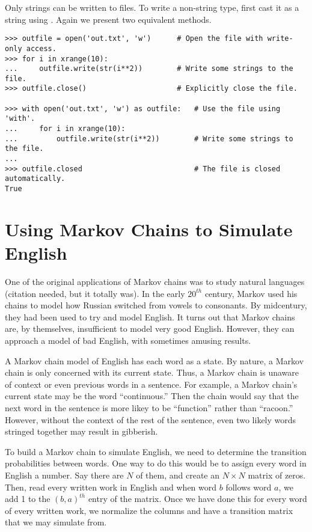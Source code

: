 Only strings can be written to files.
To write a non-string type, first cast it as a string using .
Again we present two equivalent methods.
\begin{lstlisting}
>>> outfile = open('out.txt', 'w') 		# Open the file with write-only access.
>>> for i in xrange(10):
...		outfile.write(str(i**2))		# Write some strings to the file.
>>> outfile.close()						# Explicitly close the file.

>>> with open('out.txt', 'w') as outfile: 	# Use the file using 'with'.
... 	for i in xrange(10): 				
... 		outfile.write(str(i**2)) 		# Write some strings to the file.
...
>>> outfile.closed 							# The file is closed automatically.
True
\end{lstlisting}

\section*{Using Markov Chains to Simulate English}

One of the original applications of Markov chains was to study natural languages (citation needed, but it totally was).
In the early $20^{th}$ century, Markov used his chains to model how Russian switched from vowels to consonants.
By midcentury, they had been used to try and model English.
It turns out that Markov chains are, by themselves, insufficient to model very good English.
However, they can approach a model of bad English, with sometimes amusing results.

A Markov chain model of English has each word as a state.
By nature, a Markov chain is only concerned with its current state.
Thus, a Markov chain is unaware of context or even previous words in a sentence.
For example, a Markov chain's current state may be the word ``continuous.''
Then the chain would say that the next word in the sentence is more likey to be ``function'' rather than ``racoon.''
However, without the context of the rest of the sentence, even two likely words stringed together may result in gibberish.

To build a Markov chain to simulate English, we need to determine the transition probabilities between words.
One way to do this would be to assign every word in English a number.  Say there are $N$ of them, and create an $N\times N$ matrix of zeros.
Then, read every written work in English and when word $b$ follows word $a$, we add 1 to the $(b,a)^{th}$ entry of the matrix.
Once we have done this for every word of every written work, we normalize the columns and have a transition matrix that we may simulate from.

